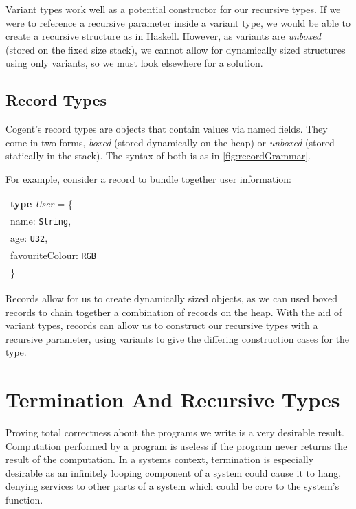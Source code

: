 Variant types work well as a potential constructor for our recursive types. If we were to reference a
recursive parameter inside a variant type, we would be able to create a recursive structure as in Haskell.
However, as variants are \textit{unboxed} (stored on the fixed size stack), we cannot allow for dynamically sized structures
using only variants, so we must look elsewhere for a solution.

\subsection{Record Types}

Cogent's record types are objects that contain values via named fields. They come in two forms, \textit{boxed}
(stored dynamically on the heap) or \textit{unboxed} (stored statically in the stack). The syntax of both is
as in \autoref{fig:recordGrammar}.

For example, consider a record to bundle together user information:

\begin{center}
    \begin{tabular}{l}
    \textbf{type} \textit{User} = \{ \\
                    \hspace{1.5em} name: \texttt{String},\\
                    \hspace{1.5em} age: \texttt{U32}, \\
                    \hspace{1.5em} favouriteColour: \texttt{RGB}\\
                    \} \\
    \end{tabular}
\end{center}

Records allow for us to create dynamically sized objects, as we can used boxed records to chain together a
combination of records on the heap. With the aid of variant types, records can allow us to construct 
our recursive types with a recursive parameter, using variants to give the 
differing construction cases for the type.

\section{Termination And Recursive Types}

Proving total correctness about the programs we write is a very desirable result.
Computation performed by a program is useless if the program never returns the
result of the computation.
In a systems context, termination is especially desirable as an infinitely looping component of a
system could cause it to hang, denying services to other parts of a system which could be core to the
system's function.

